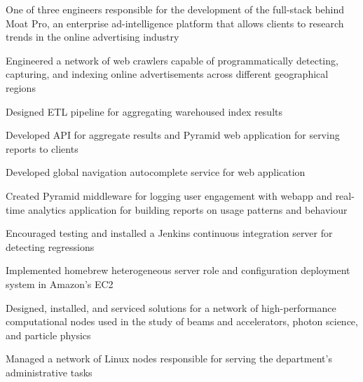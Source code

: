 \documentclass[]{resume-openfont}
\begin{document}
    \begin{tightemize}
        \item
            One of three engineers responsible for the development of the
            full-stack behind Moat Pro, an enterprise ad-intelligence platform
            that allows clients to research trends in the online advertising
            industry
        \item
            Engineered a network of web crawlers capable of programmatically
            detecting, capturing, and indexing online advertisements across
            different geographical regions
        \item
            Designed ETL pipeline for aggregating warehoused index results
        \item
            Developed API for aggregate results and Pyramid web application for
            serving reports to clients
        \item
            Developed global navigation autocomplete service for web application
        \item
            Created Pyramid middleware for logging user engagement with
            webapp and real-time analytics application for building reports on
            usage patterns and behaviour
        \item
            Encouraged testing and installed a Jenkins continuous integration
            server for detecting regressions
        \item
            Implemented homebrew heterogeneous server role and configuration
            deployment system in Amazon’s EC2
    \end{tightemize}
\sectionsep

    \begin{tightemize}
        \item
            Designed, installed, and serviced solutions for a network of
            high-performance computational nodes used in the study of beams
            and accelerators, photon science, and particle physics
        \item
            Managed a network of Linux nodes responsible for serving the
            department's administrative tasks
    \end{tightemize}
\sectionsep
\end{document}
